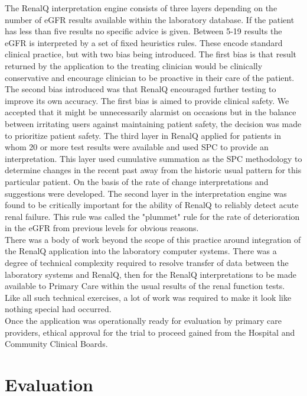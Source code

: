 \documentclass[11pt]{article}
\begin{document}
The RenalQ interpretation engine consists of three layers depending on the number of eGFR results available within the laboratory database. If the patient has less than five results no specific advice is given. Between 5-19 results the eGFR is interpreted by a set of fixed heuristics rules. These encode standard clinical practice, but with two bias being introduced. The first bias is that result returned by the application to the treating clinician would be clinically conservative and encourage clinician to be proactive in their care of the patient. The second bias introduced was that RenalQ encouraged further testing to improve its own accuracy. The first bias is aimed to provide clinical safety. We accepted that it might be unnecessarily alarmist on occasions but in the balance between irritating users against maintaining patient safety, the decision was made to prioritize patient safety. The third layer in RenalQ applied for patients in whom 20 or more test results were available and used SPC to provide an interpretation. This layer used cumulative summation as the SPC methodology to determine changes in the recent past away from the historic usual pattern for this particular patient. On the basis of the rate of change interpretations and suggestions were developed. The second layer in the interpretation engine was found to be critically important for the ability of RenalQ to reliably detect acute renal failure. This rule was called the "plummet" rule for the rate of deterioration in the eGFR from previous levels for obvious reasons. \\

There was a body of work beyond the scope of this practice around integration of the RenalQ application into the laboratory computer systems. There was a degree of technical complexity required to resolve transfer of data between the laboratory systems and RenalQ, then for the RenalQ interpretations to be made available to Primary Care within the usual results of the renal function tests. Like all such technical exercises, a lot of work was required to make it look like nothing special had occurred. \\

Once the application was operationally ready for evaluation by primary care providers, ethical approval for the trial to proceed gained from the Hospital and Community Clinical Boards. \\

\section{Evaluation}
\end{document}
